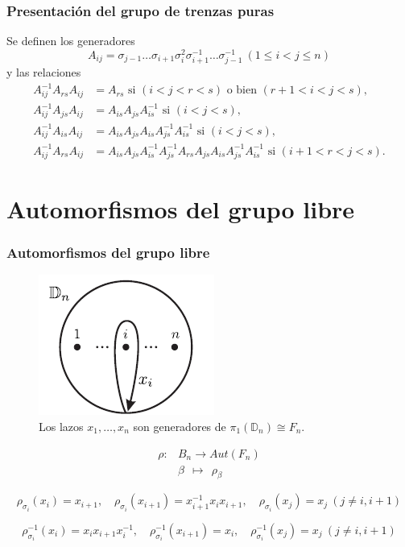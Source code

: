 \documentclass{beamer}
\theoremstyle{definition}
\newcommand{\D}{\mathbb{D}}
\begin{document}
\begin{frame}
\frametitle{Presentación del grupo de trenzas puras}
Se definen los generadores 
\[
A_{ij}=\sigma_{j-1}\dots\sigma_{i+1}\sigma_i^2\sigma_{i+1}^{-1}\dots\sigma_{j-1}^{-1}\ (1\leq i<j\leq n)
\]
y las relaciones
\begin{align*}
A_{ij}^{-1}A_{rs}A_{ij}&=A_{rs}\text{ si } (i<j<r<s)\text{ o bien } (r+1<i<j<s),\\
A_{ij}^{-1}A_{js}A_{ij}&=A_{is}A_{js}A_{is}^{-1} \text{ si } (i<j<s),\\
A_{ij}^{-1}A_{is}A_{ij}&=A_{is}A_{js}A_{is}A_{js}^{-1}A_{is}^{-1}\text{ si } (i<j<s),\\
A_{ij}^{-1}A_{rs}A_{ij}&=A_{is}A_{js}A_{is}^{-1}A_{js}^{-1}A_{rs}A_{js}A_{is}A_{js}^{-1}A_{is}^{-1}\text{ si } (i+1<r<j<s).
\end{align*}
\end{frame}

\section{Automorfismos del grupo libre}
\begin{frame}
\frametitle{Automorfismos del grupo libre}

\begin{figure}[h!]
\includegraphics[scale=0.7]{Imagenes/Disco.png}
\caption{Los lazos $x_1,\dots,x_n$ son generadores de $\pi_1(\D_n)\cong F_n$.}
\end{figure}
\end{frame}

\begin{frame}
\begin{align*}
\rho: & B_n \to Aut(F_n)\\
      & \beta\ \ \mapsto\ \ \rho_\beta
\end{align*}

$$\rho_{\sigma_i}(x_i)=x_{i+1},\quad \rho_{\sigma_i}(x_{i+1})=x_{i+1}^{-1}x_ix_{i+1},\quad \rho_{\sigma_i}(x_j)=x_j\ (j\neq i,i+1)$$

$$\rho^{-1}_{\sigma_i}(x_i)=x_ix_{i+1}x_i^{-1},\quad \rho^{-1}_{\sigma_i}(x_{i+1})=x_i,\quad \rho^{-1}_{\sigma_i}(x_j)=x_j\ (j\neq i,i+1)$$
\end{frame}
\end{document}
